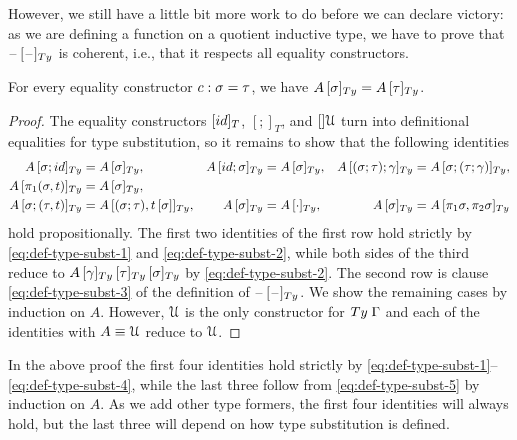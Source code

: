 \documentclass[a4paper,UKenglish,numberwithinsect,cleveref,thm-restate]{lipics-v2021}
\newcommand{\danger}{\marginpar[\hfill\dbend]{\dbend\hfill}}
\newcommand{\LT}[2][]{\todo[inline,author={L-T},caption={},color={pink},#1]{#2}}
\newcommand{\Fredrik}[2][]{\todo[inline,author={Fred},caption={},#1]{#2}}
\begin{document}
However, we still have a little bit more work to do before we can declare victory: as we are defining a function on a quotient inductive type, we have to prove that $\subTy{\blank}{\blank}$ is coherent, i.e., that it respects all equality constructors.
\begin{proposition}\label{prop:coherence-1}
  For every equality constructor $\cc : \sigma = \tau$, we have $\subTy{A}{\sigma} = \subTy{A}{\tau}$.
  \danger
\end{proposition}
\begin{proof}
  The equality constructors $[\idS]_T$, $[;]_T$, and $[]\mathcal{U}$ turn into definitional equalities for type substitution, so it remains to show that the following identities
  \begin{align*}
    \subTy{A}{\sigma;\idS}          & = \subTy{A}{\sigma},
                                    & \subTy{A}{\idS;\sigma}          & = \subTy{A}{\sigma},
                                     & \subTy{A}{(\sigma;\tau);\gamma} & = \subTy{A}{\sigma; (\tau; \gamma)}, \\
    \subTy{A}{\pi_1(\sigma, t)}      & = \subTy{A}{\sigma}, \\
    \subTy{A}{\sigma; (\tau, t)}    & = \subTy{A}{(\sigma;\tau), \sub{t}{\sigma}},
                                     & \subTy{A}{\sigma}               & = \subTy{A}{\emptyctx},
                                     & \subTy{A}{\sigma}               & = \subTy{A}{\pi_1\sigma, \pi_2\sigma}
  \end{align*}
  hold propositionally.
  The first two identities of the first row hold strictly by \eqref{eq:def-type-subst-1} and \eqref{eq:def-type-subst-2}, while both sides of the third reduce to $\subTy{\subTy{\subTy{A}{\gamma}}{\tau}}{\sigma}$ by \eqref{eq:def-type-subst-2}.
  The second row is clause \eqref{eq:def-type-subst-3} of the definition of $\subTy{\blank}{\blank}$.
  We show the remaining cases by induction on $A$.
  However, $\mathcal{U}$ is the only constructor for $\Ty\;\Gamma$ and each of the identities with $A \equiv \mathcal{U}$ reduce to $\mathcal{U}$.
\end{proof}
\begin{remark}\label{re:coherence-proof}
  In the above proof the first four identities hold strictly by \eqref{eq:def-type-subst-1}--\eqref{eq:def-type-subst-4}, while the last three follow from \eqref{eq:def-type-subst-5} by induction on $A$.
  As we add other type formers, the first four identities will always hold, but the last three will depend on how type substitution is defined.
\end{remark}
\end{document}
